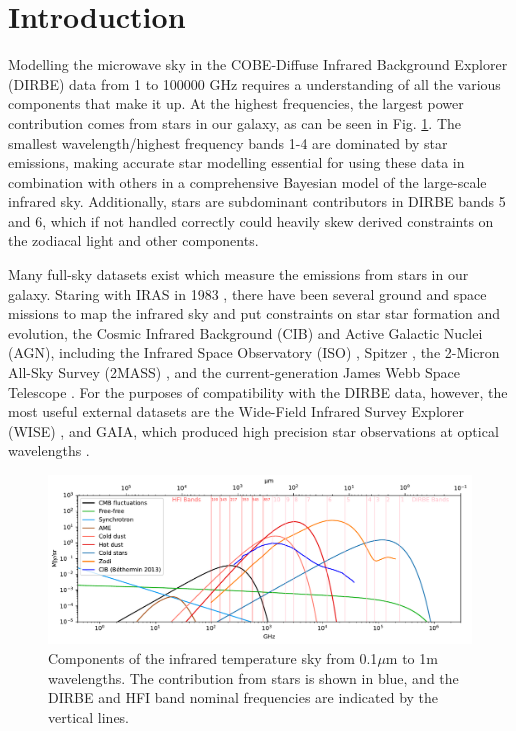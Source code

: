 \documentclass{aa}
\begin{document}
\section{Introduction}

Modelling the microwave sky in the COBE-Diffuse Infrared Background Explorer (DIRBE) data  \citep{DIRBE} from 1 to 100000 GHz requires a  understanding of all the various components that make it up. At the highest frequencies, the largest power contribution comes from stars in our galaxy, as can be seen in Fig. \ref{fig:sed}. The smallest wavelength/highest frequency bands 1-4 are dominated by star emissions, making accurate star modelling essential for using these data in combination with others in a comprehensive Bayesian model of the large-scale infrared sky. Additionally, stars are subdominant contributors in DIRBE bands 5 and 6, which if not handled correctly could heavily skew derived constraints on the zodiacal light and other components.

Many full-sky datasets exist which measure the emissions from stars in our galaxy. Staring with IRAS in 1983 \citep{iras}, there have been several ground and space missions to map the infrared sky and put constraints on star star formation and evolution, the Cosmic Infrared Background (CIB) and Active Galactic Nuclei (AGN), including the Infrared Space Observatory (ISO) \citep{iso}, Spitzer \citep{spitzer}, the 2-Micron All-Sky Survey (2MASS) \citep{2mass}, and the current-generation James Webb Space Telescope \citep{jwst}. For the purposes of compatibility with the DIRBE data, however, the most useful external datasets are the Wide-Field Infrared Survey Explorer (WISE) \citep{wise}, and GAIA, which produced high precision star observations at optical wavelengths \citep{gaia}. 

\begin{figure}
  \centering
  \includegraphics[width=\textwidth]{figs/sed/all_fgs.pdf}
  \caption{Components of the infrared temperature sky from 0.1$\mu$m to 1m wavelengths. The contribution from stars is shown in blue, and the DIRBE and HFI band nominal frequencies are indicated by the vertical lines.}
  \label{fig:sed}
\end{figure}
\end{document}
